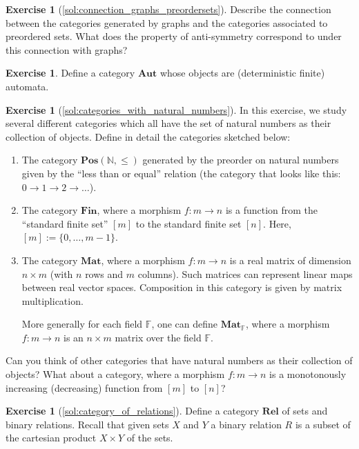 \documentclass[a4paper,11pt, oneside,titlepage=false]{scrbook}
\theoremstyle{plain}
\theoremstyle{definition}
\newtheorem{exer}[thm]{Exercise}
\newcommand{\Catb}[1]{\mathbf{#1}}
\newcommand{\POS}{\Catb{Pos}}
\newcommand{\MAT}{\Catb{Mat}}
\newcommand{\SKELFINSET}{\Catb{Fin}}
\newcommand{\REL}{\Catb{Rel}}
\newcommand{\NN}{\ensuremath{\mathbb{N}}}
\begin{document}
\begin{exer}[\cref{sol:connection_graphs_preordersets}] \label{exer:connection_graphs_preordersets}
Describe the connection between the categories generated by graphs and the categories associated to preordered sets. What does the property of anti-symmetry correspond to under this connection with graphs?
\end{exer}

\begin{exer} Define a category $\Catb{Aut}$ whose objects are (deterministic finite) automata.
\end{exer}

\begin{exer}[\cref{sol:categories_with_natural_numbers}] \label{exer:categories_with_natural_numbers}
  In this exercise, we study several different categories which all have the set of natural numbers as their collection of objects.
  Define in detail the categories sketched below:
  \begin{enumerate}
  \item The category $\POS(\NN, \leq)$ generated by the preorder on natural numbers given by the ``less than or equal'' relation (the category that looks like this: $0 \to 1 \to 2 \to \ldots$).
  \item The category $\SKELFINSET$, where a morphism $f : m \to n$ is a function from the ``standard finite set'' $[m]$ to the standard finite set $[n]$. Here, $[m] := \{0,\ldots,m-1\}$.
  \item The category $\MAT$, where a morphism $f : m \to n$ is a real matrix of dimension $n \times m$ (with $n$ rows and $m$ columns).
    Such matrices can represent linear maps between real vector spaces.
    Composition in this category is given by matrix multiplication.

    More generally for each field $\mathbb{F}$, one can define $\MAT_\mathbb{F}$, where a morphism $f : m \to n$ is an $n \times m$ matrix over the field $\mathbb{F}$.
  \end{enumerate}

  Can you think of other categories that have natural numbers as their collection of objects? What about a category, where a morphism $f : m \to n$ is a monotonously increasing (decreasing) function from $[m]$ to $[n]$?
\end{exer}

\begin{exer}[\cref{sol:category_of_relations}] \label{exer:category_of_relations}
  Define a category $\REL$ of sets and binary relations. Recall that given sets $X$ and $Y$ a binary relation $R$ is a subset of the cartesian product $X \times Y$ of the sets.
\end{exer}
\end{document}
